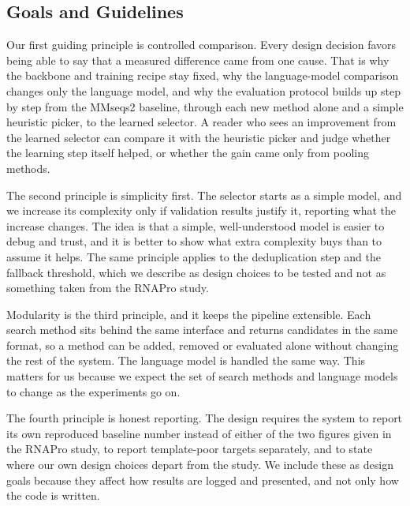\documentclass{FastFyp}
\begin{document}
\subsection{Goals and Guidelines}
Our first guiding principle is controlled comparison. Every design decision favors being able to say that a measured difference came from one cause. That is why the backbone and training recipe stay fixed, why the language-model comparison changes only the language model, and why the evaluation protocol builds up step by step from the MMseqs2 baseline, through each new method alone and a simple heuristic picker, to the learned selector. A reader who sees an improvement from the learned selector can compare it with the heuristic picker and judge whether the learning step itself helped, or whether the gain came only from pooling methods.

The second principle is simplicity first. The selector starts as a simple model, and we increase its complexity only if validation results justify it, reporting what the increase changes. The idea is that a simple, well-understood model is easier to debug and trust, and it is better to show what extra complexity buys than to assume it helps. The same principle applies to the deduplication step and the fallback threshold, which we describe as design choices to be tested and not as something taken from the RNAPro study.

Modularity is the third principle, and it keeps the pipeline extensible. Each search method sits behind the same interface and returns candidates in the same format, so a method can be added, removed or evaluated alone without changing the rest of the system. The language model is handled the same way. This matters for us because we expect the set of search methods and language models to change as the experiments go on.

The fourth principle is honest reporting. The design requires the system to report its own reproduced baseline number instead of either of the two figures given in the RNAPro study, to report template-poor targets separately, and to state where our own design choices depart from the study. We include these as design goals because they affect how results are logged and presented, and not only how the code is written.
\end{document}
